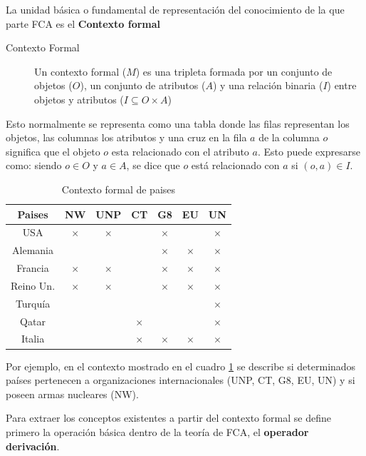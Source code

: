 	
	La unidad básica o fundamental de representación del conocimiento de la que parte FCA es el \textbf{Contexto formal}
	
	\begin{description}
		\item[Contexto Formal] Un contexto formal ($ M $) es una tripleta formada por un conjunto de objetos ($O$), un conjunto de atributos ($A$) y una relación binaria ($I$) entre objetos y atributos ($I \subseteq O \times A $)
	\end{description}

	Esto normalmente se representa como una tabla donde las filas representan los objetos, las columnas los atributos y una cruz en la fila $a$ de la columna $o$ significa que el objeto $o$ esta relacionado con el atributo $a$. Esto puede expresarse como: siendo $o \in O$ y $a \in A$, se dice que $o$ está relacionado con $a$ si $(o, a)\in I$.
	
	\begin{table}
		\centering
		\begin{tabular}{|c||c|c|c|c|c|c|}
			\hline 
			Paises & NW & UNP & CT & G8 & EU & UN \\ 
			\hline 	
			\hline 
			USA & $\times$ & $\times$ &  & $\times$ &  & $\times$ \\ 
			\hline 
			Alemania &  &  &  & $\times$ & $\times$ & $\times$ \\ 
			\hline 
			Francia & $\times$ & $\times$ &  & $\times$ & $\times$ & $\times$ \\ 
			\hline 
			Reino Un. & $\times$ & $\times$ &  & $\times$ & $\times$ & $\times$ \\ 
			\hline 
			Turquía &  &  &  &  &  & $\times$ \\ 
			\hline 
			Qatar &  &  & $\times$ &  &  & $\times$ \\ 
			\hline 
			Italia &  &  & $\times$ & $\times$ & $\times$ & $\times$ \\ 
			\hline 
		\end{tabular} 
		\caption{Contexto formal de paises}
		\label{tabla_paises}
	\end{table}

	Por ejemplo, en el contexto mostrado en el cuadro \ref{tabla_paises} se describe si determinados países pertenecen a organizaciones internacionales (UNP, CT, G8, EU, UN) y si poseen armas nucleares (NW).
	
	Para extraer los conceptos existentes a partir del contexto formal se define primero la operación básica dentro de la teoría de FCA, el \textbf{operador derivación}.
	
